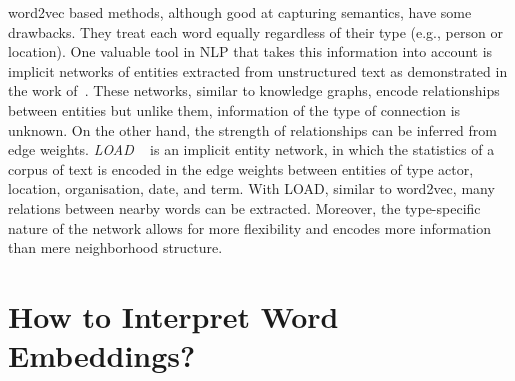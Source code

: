 word2vec based methods, although good at capturing semantics, have some drawbacks. They treat each word equally regardless of their type (e.g., person or location). One valuable tool in NLP that takes this information into account is implicit networks of entities extracted from unstructured text as demonstrated in the work of~. These networks, similar to knowledge graphs, encode relationships between entities but unlike them, information of the type of connection is unknown. On the other hand, the strength of relationships can be inferred from edge weights. \emph{LOAD} ~ is an implicit entity network, in which the statistics of a corpus of text is encoded in the edge weights between entities of type actor, location, organisation, date, and term. With LOAD, similar to word2vec, many relations between nearby words can be extracted. Moreover, the type-specific nature of the network allows for more flexibility and encodes more information than mere neighborhood structure.

 \section{How to Interpret Word Embeddings? }

